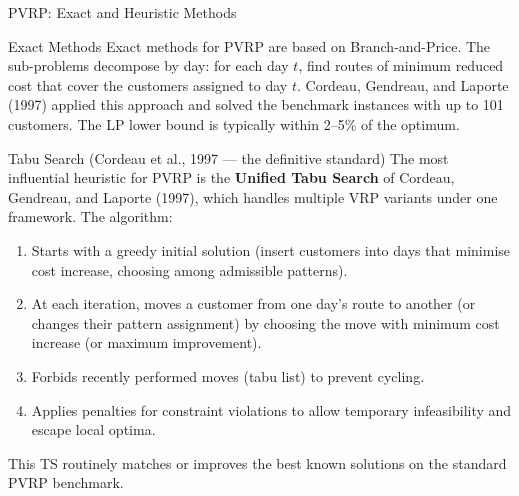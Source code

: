 \documentclass[aspectratio=169,10pt]{beamer}
\begin{document}
\begin{frame}[allowframebreaks]{PVRP: Exact and Heuristic Methods}

\begin{block}{Exact Methods}
  Exact methods for PVRP are based on Branch-and-Price.  The sub-problems
  decompose by day: for each day $t$, find routes of minimum reduced cost
  that cover the customers assigned to day $t$.  Cordeau, Gendreau, and
  Laporte (1997) applied this approach and solved the benchmark instances
  with up to 101 customers.  The LP lower bound is typically within 2--5\%
  of the optimum.
\end{block}

\begin{block}{Tabu Search (Cordeau et al., 1997 --- the definitive standard)}
  The most influential heuristic for PVRP is the \textbf{Unified Tabu Search}
  of Cordeau, Gendreau, and Laporte (1997), which handles multiple VRP
  variants under one framework.  The algorithm:
  \begin{enumerate}
    \item Starts with a greedy initial solution (insert customers into days
          that minimise cost increase, choosing among admissible patterns).
    \item At each iteration, moves a customer from one day's route to another
          (or changes their pattern assignment) by choosing the move with
          minimum cost increase (or maximum improvement).
    \item Forbids recently performed moves (tabu list) to prevent cycling.
    \item Applies penalties for constraint violations to allow temporary
          infeasibility and escape local optima.
  \end{enumerate}
  This TS routinely matches or improves the best known solutions on the
  standard PVRP benchmark.
\end{block}

\framebreak


\end{frame}
\end{document}
